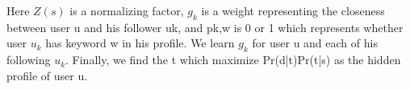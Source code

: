 Here $Z(s)$ is a normalizing factor, $g_k$ is a weight representing the closeness between user u and his follower uk, and pk,w is 0 or 1 which represents whether user $u_k$ has keyword w in his profile. We learn $g_k$ for user u and each of his following $u_k$.
Finally, we find the t which maximize Pr(d|t)Pr(t|s) as the hidden profile of user u.
